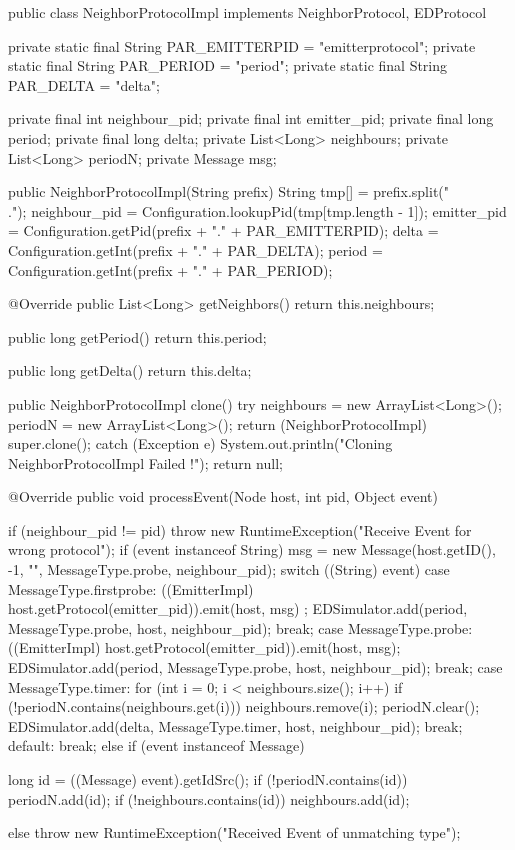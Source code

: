 \documentclass[10pt]{report}
\begin{document}
\noindent\begin{minipage}{\textwidth}
\begin{shaded}
\begin{boxedlisting}
public class NeighborProtocolImpl implements NeighborProtocol, EDProtocol {

	private static final String PAR_EMITTERPID = "emitterprotocol";
	private static final String PAR_PERIOD = "period";
	private static final String PAR_DELTA = "delta";

	private final int neighbour_pid;
	private final int emitter_pid;
	private final long period;
	private final long delta;
	private List<Long> neighbours;
	private List<Long> periodN;
	private Message msg;
	
	public NeighborProtocolImpl(String prefix) {
		String tmp[] = prefix.split("\\.");
		neighbour_pid = Configuration.lookupPid(tmp[tmp.length - 1]);
		emitter_pid = Configuration.getPid(prefix + "." + PAR_EMITTERPID);
		delta = Configuration.getInt(prefix + "." + PAR_DELTA);
		period = Configuration.getInt(prefix + "." + PAR_PERIOD);
	}

	@Override
	public List<Long> getNeighbors() {
		return this.neighbours;
	}

	public long getPeriod() {
		return this.period;
	}

	public long getDelta() {
		return this.delta;
	}

	public NeighborProtocolImpl clone() {
		try {
			neighbours = new ArrayList<Long>();
			periodN = new ArrayList<Long>();
			return (NeighborProtocolImpl) super.clone();
		} catch (Exception e) {
			System.out.println("Cloning NeighborProtocolImpl Failed !");
		}
		return null;
	}

	@Override
	public void processEvent(Node host, int pid, Object event) {
		if (neighbour_pid != pid) {
			throw new RuntimeException("Receive Event for wrong protocol");
		}
		if (event instanceof String) {
			msg = new Message(host.getID(), -1, "", MessageType.probe, neighbour_pid);
			switch ((String) event) {
			case MessageType.firstprobe:
				((EmitterImpl) host.getProtocol(emitter_pid)).emit(host, msg) ;
				EDSimulator.add(period, MessageType.probe, host, neighbour_pid);
				break;
			case MessageType.probe:
				((EmitterImpl) host.getProtocol(emitter_pid)).emit(host, msg);
				EDSimulator.add(period, MessageType.probe, host, neighbour_pid);
				break;
			case MessageType.timer:
				for (int i = 0; i < neighbours.size(); i++) {
					if (!periodN.contains(neighbours.get(i))) {
						neighbours.remove(i);
					}
				}
				periodN.clear();
				EDSimulator.add(delta, MessageType.timer, host, neighbour_pid);
				break;
			default:
				break;
			}
		} else if (event instanceof Message) {
			long id = ((Message) event).getIdSrc();
			if (!periodN.contains(id)) {
				periodN.add(id);
			}
			if (!neighbours.contains(id)) {
				neighbours.add(id);
			}
			
		} else {
			throw new RuntimeException("Received Event of unmatching type");
		}
	}
}
\end{boxedlisting}
\end{shaded}
\end{minipage}
\end{document}
